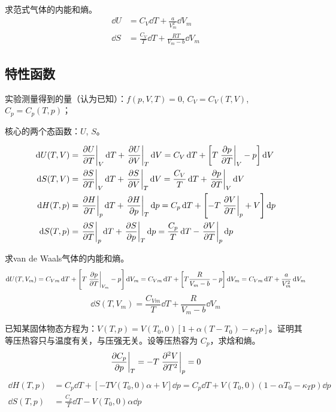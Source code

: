 \begin{framed}
    求范式气体的内能和熵。
    \begin{align*}
        \dd{U} & = C_V \dd{T} + \frac{a}{V_m^2} \dd{V_m}               \\
        \dd{S} & = \frac{C_V}{T} \dd{T} + \frac{R T}{V_m - b} \dd{V_m}
    \end{align*}
\end{framed}

\subsection{特性函数}

实验测量得到的量（认为已知）：$f(p, V, T) = 0$, $C_V = C_V(T, V)$, $C_p = C_p(T, p)$；

核心的两个态函数：$U$, $S$。

\begin{align*}
    \dd{U(T, V)} & = \left.\pdv{U}{T}\right|_V \dd{T} + \left.\pdv{U}{V}\right|_T \dd{V} = C_V \dd{T} + \left[T \left.\pdv{p}{T}\right|_V - p\right] \dd{V}   \\
    \dd{S(T, V)} & = \left.\pdv{S}{T}\right|_V \dd{T} + \left.\pdv{S}{V}\right|_T \dd{V} = \frac{C_V}{T} \dd{T} + \left.\pdv{p}{T}\right|_V \dd{V}            \\
    \dd{H(T, p)} & = \left.\pdv{H}{T}\right|_p \dd{T} + \left.\pdv{H}{p}\right|_T \dd{p} = C_p \dd{T} + \left[- T \left.\pdv{V}{T}\right|_p + V\right] \dd{p} \\
    \dd{S(T, p)} & = \left.\pdv{S}{T}\right|_p \dd{T} + \left.\pdv{S}{p}\right|_T \dd{p} = \frac{C_p}{T} \dd{T} - \left.\pdv{V}{T}\right|_p \dd{p}
\end{align*}

\begin{framed}
    求van de Waals气体的内能和熵。
    \[
        \dd{U(T, V_m)} = C_{Vm} \dd{T} + \left[T \left.\pdv{p}{T}\right|_{V_m} - p\right] \dd{V_m} = C_{Vm} \dd{T} + \left[T \frac{R}{V_m - b} - p\right] \dd{V_m} = C_{Vm} \dd{T} + \frac{a}{V_m^2} \dd{V_m}
    \]\[
        \dd{S(T, V_m)} = \frac{C_{Vm}}{T} \dd{T} + \frac{R}{V_m - b} \dd{V_m}
    \]
\end{framed}

\begin{framed}
    已知某固体物态方程为：$V(T, p) = V(T_0, 0) \left[1 + \alpha (T - T_0) - \kappa_T p\right]$。证明其等压热容只与温度有关，与压强无关。设等压热容为 $C_p$，求焓和熵。
    \[
        \left.\pdv{C_p}{p}\right|_T = - T \left.\pdv[2]{V}{T}\right|_p = 0
    \]
    \begin{align*}
        \dd{H(T, p)} & = C_p \dd{T} + \left[- T V(T_0, 0) \alpha + V\right] \dd{p} = C_p \dd{T} + V(T_0, 0) \left(1 - \alpha T_0 - \kappa_T p\right) \dd{p} \\
        \dd{S(T, p)} & = \frac{C_p}{T} \dd{T} - V(T_0, 0) \alpha \dd{p}                                                                                     \\
    \end{align*}
\end{framed}

